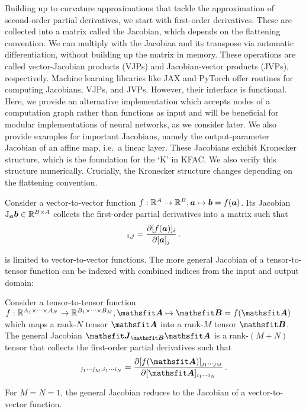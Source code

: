 Building up to curvature approximations that tackle the approximation of second-order partial derivatives, we start with first-order derivatives.
These are collected into a matrix called the Jacobian, which depends on the flattening convention.
We can multiply with the Jacobian and its transpose via automatic differentiation, without building up the matrix in memory.
These operations are called vector-Jacobian products (VJPs) and Jacobian-vector products (JVPs), respectively.
Machine learning libraries like JAX and PyTorch offer routines for computing Jacobians, VJPs, and JVPs.
However, their interface is functional.
Here, we provide an alternative implementation which accepts nodes of a computation graph rather than functions as input and will be beneficial for modular implementations of neural networks, as we consider later.
We also provide examples for important Jacobians, namely the output-parameter Jacobian of an affine map, i.e.\, a linear layer.
These Jacobians exhibit Kronecker structure, which is the foundation for the `K' in KFAC.
We also verify this structure numerically.
Crucially, the Kronecker structure changes depending on the flattening convention.

\begin{definition}\label{def:vector_jacobian}
  Consider a vector-to-vector function $f: {\mathbb{R}}^A \to {\mathbb{R}}^B, {\bm{a}} \mapsto {\bm{b}} = f({\bm{a}})$.
  Its Jacobian $\mathrm{J}_{{\bm{a}}}{\bm{b}} \in {\mathbb{R}}^{B \times A}$ collects the first-order partial derivatives into a matrix such that
  \begin{align*}
    [\jac_{\va} \vb]_{i,j} = \frac{\partial [f(\va)]_i}{\partial [\va]_j}\,.
  \end{align*}
\end{definition}
 is limited to vector-to-vector functions.
The more general Jacobian of a tensor-to-tensor function can be indexed with combined indices from the input and output domain:

\begin{definition}\label{def:general_jacobian}
  Consider a tensor-to-tensor function $f: \sR^{A_1 \times \dots \times A_N} \to \sR^{B_1 \times \dots \times B_M}, \tA \mapsto \tB = f(\tA)$ which maps a rank-$N$ tensor $\tA$ into a rank-$M$ tensor $\tB$. The general Jacobian $\tJ_{\tB}\tA$ is a rank-$(M+N)$ tensor that collects the first-order partial derivatives such that
  \begin{align*}
    [\tJ_{\tA}\tB]_{j_1 \cdots j_M, i_1 \cdots i_N} = \frac{\partial [f(\tA)]_{j_1 \cdots j_M}}{\partial [\tA]_{i_1 \cdots i_N}}\,.
  \end{align*}
\end{definition}
For $M=N=1$, the general Jacobian reduces to the Jacobian of a vector-to-vector function.

